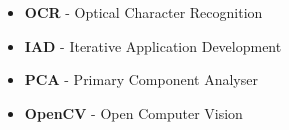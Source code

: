 

\begin{itemize}
	\item{\textbf{OCR} - Optical Character Recognition}
	\item{\textbf{IAD} - Iterative Application Development}
	\item{\textbf{PCA} - Primary Component Analyser}
	\item{\textbf{OpenCV} - Open Computer Vision}
\end{itemize}